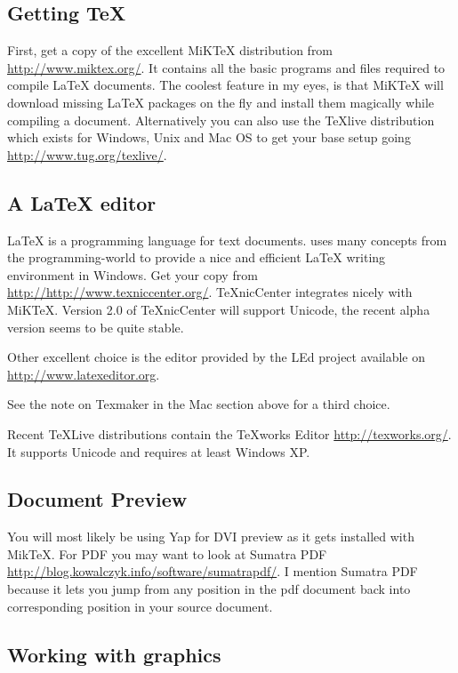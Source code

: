 \subsection{Getting \TeX{}}

First, get a copy of the excellent MiK\TeX{} distribution from\\
\url{http://www.miktex.org/}. It contains all the basic programs and files
required to compile \LaTeX{} documents.  The coolest feature in my eyes, is
that MiK\TeX{} will download missing \LaTeX{} packages on the fly and install them
magically while compiling a document. Alternatively you can also use
the TeXlive distribution which exists for Windows, Unix and Mac OS to
get your base setup going \url{http://www.tug.org/texlive/}.

\subsection{A \LaTeX{} editor}

\LaTeX{} is a programming language for text documents. 
uses many concepts from the programming-world to provide a nice and
efficient \LaTeX{} writing environment in Windows. Get your copy from\\
\url{http://http://www.texniccenter.org/}. TeXnicCenter integrates nicely with
MiKTeX. Version 2.0 of TeXnicCenter will support Unicode, the recent alpha version
seems to be quite stable.

Other excellent choice is the editor provided by the LEd project available
on \url{http://www.latexeditor.org}.

See the note on Texmaker in the Mac section above for a third choice.

Recent \TeX Live distributions contain the \TeX{}works Editor
\url{http://texworks.org/}. It supports Unicode and requires at least Windows XP.

\subsection{Document Preview}

You will most likely be using Yap for DVI preview as it gets installed with
MikTeX. For PDF you may want to look at Sumatra
PDF \url{http://blog.kowalczyk.info/software/sumatrapdf/}. I mention Sumatra PDF
because it lets you jump from any position in the pdf document back into
corresponding position in your source document.

\subsection{Working with graphics}

